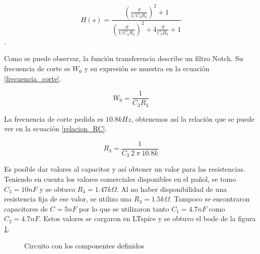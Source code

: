 \begin{equation} H(s) = \frac{(\frac{S}{1/C_{3} R_{3}})^2 + 1} {(\frac{S}{1/C_{3}R_{3}})^2 + 4\frac{S}{C_{3}R_{3}} + 1}  \label{transferencia_1}\end{equation}.

Como se puede observar, la función transferencia describe un filtro Notch. Su frecuencia de corte es
$W_0$ y su expresión se muestra en la ecuación \ref{frecuencia_corte}.

\begin{equation} W_{0} =  \frac{1}{C_{3} R_{3}}  \label{frecuencia_corte}\end{equation}

La frecuencia de corte pedida es $10.8k Hz$, obtenemos así la relación que se puede ver en la ecuación \ref{relacion_RC}.

\begin{equation} R_{3} = \frac{1}{C_{3} \  2 \ \pi \ 10.8k} \label{relacion_RC}\end{equation}

Es posible dar valores al capacitor y así obtener un valor para las resistencias. Teniendo en cuenta los valores comerciales disponibles en el pañol, se tomo $C_{3} = 10nF$ y se obtuvo $R_{3}=1.47k\Omega$. Al no haber disponibilidad de una resistencia fija de ese valor, se utilizo una $R_{3}=1.5k\Omega$. Tampoco se encontraron capacitores de $C = 5nF$ por lo que se utilizaron tanto $C_{1} = 4.7nF$ como  $C_{2} = 4.7nF$. Estos valores se cargaron en LTspice y se obtuvo el bode de la figura \ref{fig:bode_ltspice_teorico}.


\begin{figure}[H] 
\begin{center}
\caption{Circuito con los componentes definidos}
\label{fig:bode_ltspice_teorico}
\end{center}
\end{figure}

